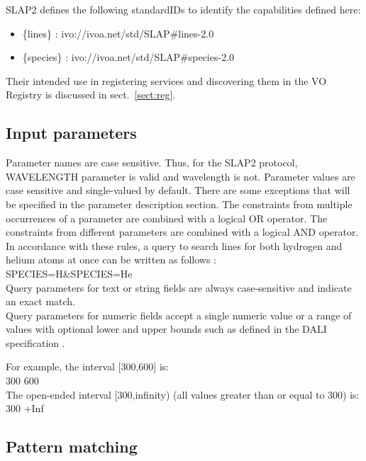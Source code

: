 \documentclass[11pt,a4paper]{ivoa}
\begin{document}
SLAP2 defines the following standardIDs to identify the capabilities
defined here:

\begin{itemize}
  \item \{lines\} : ivo://ivoa.net/std/SLAP\#lines-2.0
  \item \{species\} : ivo://ivoa.net/std/SLAP\#species-2.0
  \end{itemize}

Their intended use in registering services and discovering them in
the VO Registry is discussed in sect.~\ref{sect:reg}.

\subsection{Input parameters}
\label{sect:input-pars}

Parameter names are case sensitive. Thus, for the SLAP2 protocol, WAVELENGTH parameter is valid
and wavelength is not. Parameter values are case sensitive and single-valued by default.
There are some exceptions that will be specified in the parameter description section.
The constraints from multiple occurrences of a parameter are
combined with a logical OR operator. The constraints from different
parameters are combined with a logical AND operator. In accordance with these rules,
a query to search lines for both hydrogen and helium atoms at once can be written as follows : \\

SPECIES=H\&SPECIES=He \\
Query parameters for text or string fields are always case-sensitive and indicate an exact match. \\
Query parameters for numeric fields accept a single numeric value or a range
of values with optional lower and upper bounds such as defined in the DALI specification \citep{2017ivoa.spec.0517D}.

For example, the interval [300,600] is: \\
300 600 \\
The open-ended interval [300,infinity) (all values greater than or equal to
300) is: \\
300 +Inf \\

\subsection{Pattern matching}
\label{sect:pattern-matching}
\end{document}
